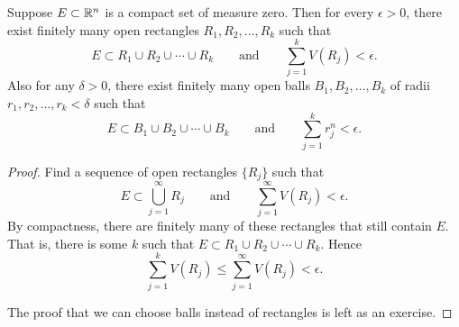 \begin{prop} \label{mv:prop:compactnull}
Suppose $E \subset {\mathbb{R}}^n$ is a compact set of measure zero.  Then for
every $\epsilon > 0$, there exist
finitely many open rectangles $R_1,R_2,\ldots,R_k$ such that
\begin{equation*}
E \subset R_1 \cup R_2 \cup \cdots \cup R_k
\qquad \text{and} \qquad
\sum_{j=1}^k V(R_j) < \epsilon.
\end{equation*}
Also for any $\delta > 0$,
there exist finitely many open balls $B_1,B_2,\ldots,B_k$ of radii
$r_1,r_2,\ldots,r_k < \delta$ such that
\begin{equation*}
E \subset B_1 \cup B_2 \cup \cdots \cup B_k
\qquad \text{and} \qquad
\sum_{j=1}^k r_j^n < \epsilon.
\end{equation*}
\end{prop}

\begin{proof}
Find a sequence of open rectangles $\{ R_j \}$ such that 
\begin{equation*}
E \subset \bigcup_{j=1}^\infty R_j
\qquad \text{and} \qquad
\sum_{j=1}^\infty V(R_j) < \epsilon.
\end{equation*}
By compactness, there are finitely
many of these rectangles that still contain $E$.  That is, there is some $k$ such
that
$E \subset R_1 \cup R_2 \cup \cdots \cup R_k$.  Hence
\begin{equation*}
\sum_{j=1}^k V(R_j) \leq
\sum_{j=1}^\infty V(R_j) < \epsilon.
\end{equation*}

The proof that we can choose balls instead of rectangles is left as an
exercise.
\end{proof}


